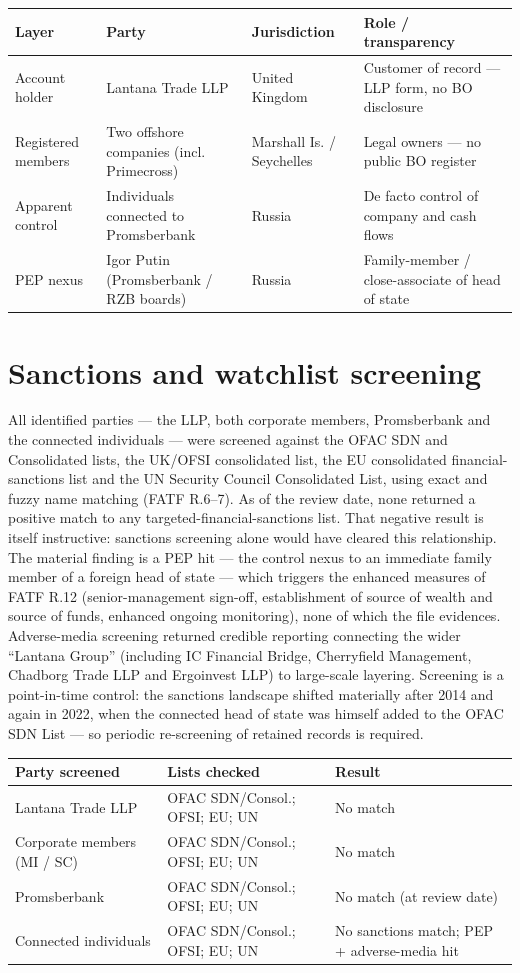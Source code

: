 \documentclass[10.5pt]{article}
\begin{document}
\begin{longtable}{@{}L{2.6cm}L{5cm}L{2.4cm}L{4cm}@{}}
\toprule
\textbf{Layer} & \textbf{Party} & \textbf{Jurisdiction} & \textbf{Role / transparency} \\
\midrule
Account holder & Lantana Trade LLP & United Kingdom & Customer of record --- LLP form, no BO disclosure \\
Registered members & Two offshore companies (incl. Primecross) & Marshall Is. / Seychelles & Legal owners --- no public BO register \\
Apparent control & Individuals connected to Promsberbank & Russia & De facto control of company and cash flows \\
PEP nexus & Igor Putin (Promsberbank / RZB boards) & Russia & Family-member / close-associate of head of state \\
\bottomrule
\end{longtable}

\section{Sanctions and watchlist screening}
All identified parties --- the LLP, both corporate members, Promsberbank and the connected individuals --- were screened against the OFAC SDN and Consolidated lists, the UK/OFSI consolidated list, the EU consolidated financial-sanctions list and the UN Security Council Consolidated List, using exact and fuzzy name matching (FATF R.6--7). As of the review date, none returned a positive match to any targeted-financial-sanctions list. That negative result is itself instructive: sanctions screening alone would have cleared this relationship. The material finding is a PEP hit --- the control nexus to an immediate family member of a foreign head of state --- which triggers the enhanced measures of FATF R.12 (senior-management sign-off, establishment of source of wealth and source of funds, enhanced ongoing monitoring), none of which the file evidences. Adverse-media screening returned credible reporting connecting the wider ``Lantana Group'' (including IC Financial Bridge, Cherryfield Management, Chadborg Trade LLP and Ergoinvest LLP) to large-scale layering. Screening is a point-in-time control: the sanctions landscape shifted materially after 2014 and again in 2022, when the connected head of state was himself added to the OFAC SDN List --- so periodic re-screening of retained records is required.

\begin{longtable}{@{}L{3.6cm}L{6cm}L{4.4cm}@{}}
\toprule
\textbf{Party screened} & \textbf{Lists checked} & \textbf{Result} \\
\midrule
Lantana Trade LLP & OFAC SDN/Consol.; OFSI; EU; UN & No match \\
Corporate members (MI / SC) & OFAC SDN/Consol.; OFSI; EU; UN & No match \\
Promsberbank & OFAC SDN/Consol.; OFSI; EU; UN & No match (at review date) \\
Connected individuals & OFAC SDN/Consol.; OFSI; EU; UN & No sanctions match; PEP + adverse-media hit \\
\bottomrule
\end{longtable}
\end{document}
